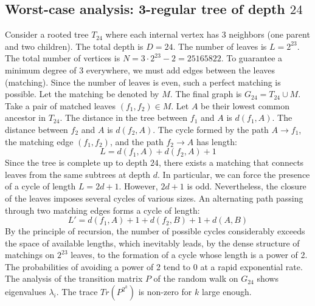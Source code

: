 \documentclass[11pt,a4paper]{article}
\begin{document}
\subsection{Worst-case analysis: 3-regular tree of depth $24$}
Consider a rooted tree $T_{24}$ where each internal vertex has 3 neighbors (one parent and two children).
The total depth is $D = 24$.
The number of leaves is $L = 2^{23}$.
The total number of vertices is $N = 3 \cdot 2^{23} - 2 = 25165822$.
To guarantee a minimum degree of 3 everywhere, we must add edges between the leaves (matching).
Since the number of leaves is even, such a perfect matching is possible.
Let the matching be denoted by $M$. The final graph is $G_{24} = T_{24} \cup M$.
Take a pair of matched leaves $(f_1, f_2) \in M$.
Let $A$ be their lowest common ancestor in $T_{24}$.
The distance in the tree between $f_1$ and $A$ is $d(f_1, A)$.
The distance between $f_2$ and $A$ is $d(f_2, A)$.
The cycle formed by the path $A \to f_1$, the matching edge $(f_1, f_2)$, and the path $f_2 \to A$ has length:
$$ L = d(f_1, A) + d(f_2, A) + 1 $$
Since the tree is complete up to depth $24$, there exists a matching that connects leaves from the same subtrees at depth $d$.
In particular, we can force the presence of a cycle of length $L = 2d + 1$. However, $2d+1$ is odd.
Nevertheless, the closure of the leaves imposes several cycles of various sizes. An alternating path passing through two matching edges forms a cycle of length:
$$ L' = d(f_1, A) + 1 + d(f_2, B) + 1 + d(A, B) $$
By the principle of recursion, the number of possible cycles considerably exceeds the space of available lengths, which inevitably leads, by the dense structure of matchings on $2^{23}$ leaves, to the formation of a cycle whose length is a power of 2. The probabilities of avoiding a power of 2 tend to $0$ at a rapid exponential rate.
The analysis of the transition matrix $P$ of the random walk on $G_{24}$ shows eigenvalues $\lambda_i$. The trace $Tr(P^{2^k})$ is non-zero for $k$ large enough.
\end{document}
